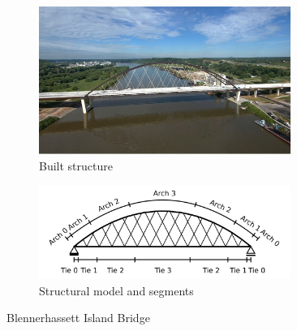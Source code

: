 \begin{figure}[H]
\centering
\begin{subfigure}{0.5\textwidth}
    \centering
    \includegraphics[width=0.9\textwidth]{overleaf/Pictures/Blennerhassett_2.jpg}
    \caption{Built structure}
    \label{fig:Blennerhassett2_a}
\end{subfigure}%
\begin{subfigure}{.5\textwidth}
    \centering
    \vspace*{0.67cm}
    \includegraphics[width=0.9\textwidth]{illustrations/figures/segments.png}
    \vspace*{0.67cm}
    \caption{Structural model and segments}
    \label{fig:fig:Blennerhassett2_b}
\end{subfigure}
\caption{Blennerhassett Island Bridge}
\label{fig:Blennerhassett2}
\end{figure}

